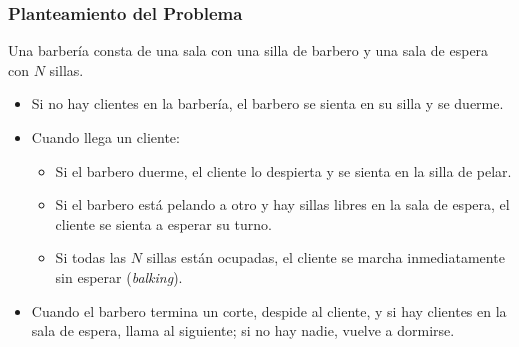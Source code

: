 \subsubsection{Planteamiento del Problema}
Una barbería consta de una sala con una silla de barbero y una sala de espera con $N$ sillas.
\begin{itemize}[leftmargin=*]
    \item Si no hay clientes en la barbería, el barbero se sienta en su silla y se duerme.
    \item Cuando llega un cliente:
    \begin{itemize}
        \item Si el barbero duerme, el cliente lo despierta y se sienta en la silla de pelar.
        \item Si el barbero está pelando a otro y hay sillas libres en la sala de espera, el cliente se sienta a esperar su turno.
        \item Si todas las $N$ sillas están ocupadas, el cliente se marcha inmediatamente sin esperar (\emph{balking}).
    \end{itemize}
    \item Cuando el barbero termina un corte, despide al cliente, y si hay clientes en la sala de espera, llama al siguiente; si no hay nadie, vuelve a dormirse.
\end{itemize}

